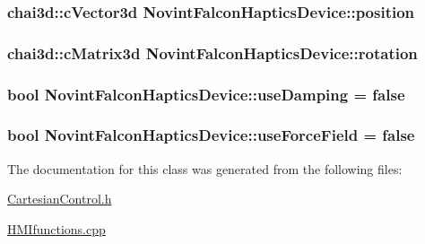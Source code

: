 \subsubsection[{\texorpdfstring{position}{position}}]{\setlength{\rightskip}{0pt plus 5cm}chai3d\+::c\+Vector3d Novint\+Falcon\+Haptics\+Device\+::position}\hypertarget{classNovintFalconHapticsDevice_a31027f37186c69612aaab345f6db4b2b}{}\label{classNovintFalconHapticsDevice_a31027f37186c69612aaab345f6db4b2b}
\subsubsection[{\texorpdfstring{rotation}{rotation}}]{\setlength{\rightskip}{0pt plus 5cm}chai3d\+::c\+Matrix3d Novint\+Falcon\+Haptics\+Device\+::rotation}\hypertarget{classNovintFalconHapticsDevice_a28cf6108da9a0a2fd1830e517b4eb1f7}{}\label{classNovintFalconHapticsDevice_a28cf6108da9a0a2fd1830e517b4eb1f7}
\subsubsection[{\texorpdfstring{use\+Damping}{useDamping}}]{\setlength{\rightskip}{0pt plus 5cm}bool Novint\+Falcon\+Haptics\+Device\+::use\+Damping = false}\hypertarget{classNovintFalconHapticsDevice_a8343a6b7e8c05449d1fd4daf39f346a9}{}\label{classNovintFalconHapticsDevice_a8343a6b7e8c05449d1fd4daf39f346a9}
\subsubsection[{\texorpdfstring{use\+Force\+Field}{useForceField}}]{\setlength{\rightskip}{0pt plus 5cm}bool Novint\+Falcon\+Haptics\+Device\+::use\+Force\+Field = false}\hypertarget{classNovintFalconHapticsDevice_ab057b4217959d896c52fc5167be1314d}{}\label{classNovintFalconHapticsDevice_ab057b4217959d896c52fc5167be1314d}


The documentation for this class was generated from the following files\+:\begin{DoxyCompactItemize}
\item 
\hyperlink{CartesianControl_8h}{Cartesian\+Control.\+h}\item 
\hyperlink{HMIfunctions_8cpp}{H\+M\+Ifunctions.\+cpp}\end{DoxyCompactItemize}
